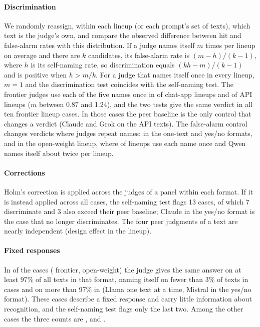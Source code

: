 \paragraph{Discrimination} We randomly reassign, within each lineup (or each
prompt's set of texts), which text is the judge's own, and compare the
observed difference between hit and false-alarm rates with this distribution.
If a judge names itself $m$ times per lineup on average and there are $k$
candidates, its false-alarm rate is $(m-h)/(k-1)$, where $h$ is its self-naming
rate, so discrimination equals $(kh-m)/(k-1)$ and is positive when $h>m/k$. For
a judge that names itself once in every lineup, $m=1$ and the discrimination
test coincides with the self-naming test. The frontier judges use each of the
five names once in \CROneToOneChat{} of chat-app lineups and \CROneToOneApi{}
of API lineups ($m$ between 0.87 and 1.24), and the two tests give the same
verdict in all ten frontier lineup cases. In those cases the peer baseline is
the only control that changes a verdict (Claude and Grok on the API texts). The
false-alarm control changes verdicts where judges repeat names: in the one-text
and yes/no formats, and in the open-weight lineup, where \CXOneToOneOpen{} of
lineups use each name once and Qwen names itself about twice per lineup.

\paragraph{Corrections} Holm's correction is applied across the judges of a
panel within each format. If it is instead applied across all \CVcells{} cases,
the self-naming test flags 13 cases, of which 7 discriminate and 3 also exceed
their peer baseline; Claude in the yes/no format is the case that no longer
discriminates. The four peer judgments of a text are nearly
independent (design effect \PeerDeffLineup{} in the lineup).

\paragraph{Fixed responses} In \CXFixedCells{} of the \CVcells{} cases
(\CXFixedFrontier{} frontier, \CXFixedOpen{} open-weight) the judge gives the same answer on at least 97\% of
all texts in that format, naming itself on fewer than 3\% of texts in
\CXFixedLow{} cases and on more than 97\% in \CXFixedHigh{} (Llama one text at
a time, Mistral in the yes/no format). These cases describe a fixed response
and carry little information about recognition, and the self-naming test flags
only the last two. Among the other \CXVaryCells{} cases the three counts are
\CXVaryFlagged{}, \CVdisc{} and \CVbothAttr{}.

